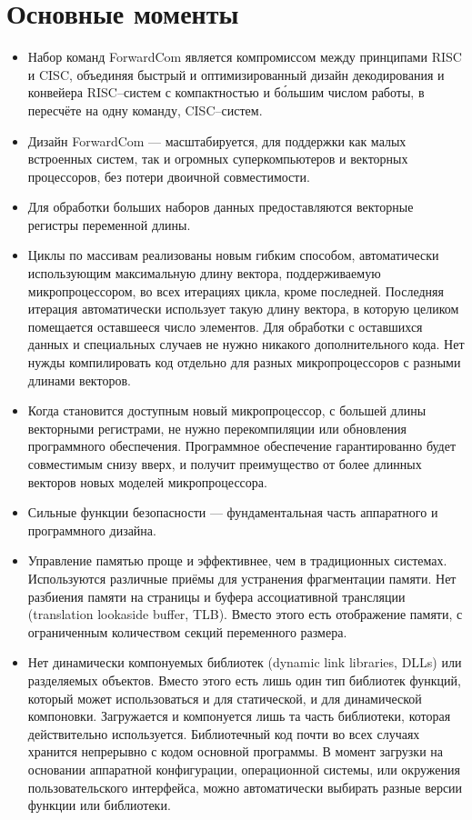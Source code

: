 \documentclass[forwardcom.tex]{subfiles}
\begin{document}
\section{Основные моменты}
\begin{itemize}
\item Набор команд ForwardCom является компромиссом между принципами RISC и CISC, объединяя быстрый и оптимизированный дизайн декодирования и конвейера
RISC--систем с компактностью и б\'{о}льшим числом работы, в пересчёте на одну команду, CISC--систем.

\item Дизайн ForwardCom --- масштабируется, для поддержки как малых встроенных систем, так и огромных суперкомпьютеров и векторных процессоров, без 
потери двоичной совместимости.

\item Для обработки больших наборов данных предоставляются векторные регистры переменной длины.

\item Циклы по массивам реализованы новым гибким способом, автоматически использующим максимальную длину вектора, поддерживаемую микропроцессором, во
всех итерациях цикла, кроме последней. Последняя итерация автоматически использует такую длину вектора, в которую целиком помещается оставшееся число
элементов. Для обработки с оставшихся данных и специальных случаев не нужно никакого дополнительного кода. Нет нужды компилировать код отдельно для 
разных микропроцессоров с разными длинами векторов.

\item Когда становится доступным новый микропроцессор, с большей длины векторными регистрами, не нужно перекомпиляции или обновления программного обеспечения. Программное обеспечение гарантированно будет совместимым снизу вверх, и получит преимущество от более длинных векторов новых моделей микропроцессора.

\item Сильные функции безопасности --- фундаментальная часть аппаратного и программного дизайна.

\item Управление памятью проще и эффективнее, чем в традиционных системах. Используются различные приёмы для устранения фрагментации памяти. Нет разбиения  памяти на страницы и буфера ассоциативной трансляции (translation lookaside buffer, TLB). Вместо этого есть отображение памяти, с ограниченным количеством секций переменного размера.

\item Нет динамически компонуемых библиотек (dynamic link libraries, DLLs) или разделяемых объектов. Вместо этого есть лишь один тип библиотек функций,
который может использоваться и для статической, и для динамической компоновки. Загружается и компонуется лишь та часть библиотеки, которая действительно используется. Библиотечный код почти во всех случаях хранится непрерывно с кодом основной программы. В момент загрузки на основании аппаратной конфигурации, операционной системы, или окружения пользовательского интерфейса, можно автоматически выбирать разные версии функции или библиотеки.


\end{itemize}
\end{document}
